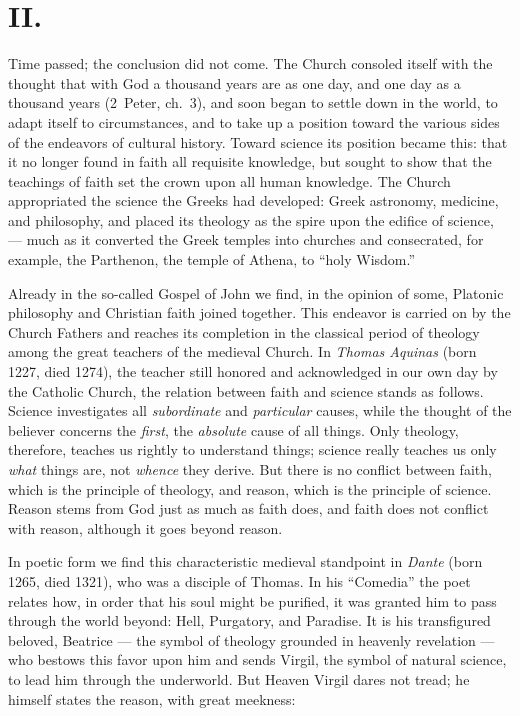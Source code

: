 \documentclass[12pt,a4paper,openany]{book}
\newcommand{\opage}[1]{\marginnote{\footnotesize\textit{[#1]}}}
\begin{document}
\section*{II.}

Time passed; the conclusion did not come. The Church consoled itself with
the thought that with God a thousand years are as one day, and one day as a
thousand years (2~Peter, ch.~3), and soon began to settle down in the world,
to adapt itself to circumstances, and to take up a position toward the
various sides of the endeavors of cultural history. Toward science its
position became this: that it no longer found in faith all requisite
knowledge, but sought to show that the teachings of faith set the crown upon
all human knowledge. The Church appropriated the
\opage{197}science the Greeks had developed: Greek astronomy, medicine, and philosophy, and placed its
theology as the spire upon the edifice of science, --- much as it converted the
Greek temples into churches and consecrated, for example, the Parthenon,
the temple of Athena, to ``holy Wisdom.''

Already in the so-called Gospel of John we find, in the opinion of some,
Platonic philosophy and Christian faith joined together. This endeavor is
carried on by the Church Fathers and reaches its completion in the classical
period of theology among the great teachers of the medieval Church. In
\emph{Thomas Aquinas} (born 1227, died 1274), the teacher still honored and
acknowledged in our own day by the Catholic Church, the relation between
faith and science stands as follows. Science investigates all \emph{subordinate} and
\emph{particular} causes, while the thought of the believer concerns the \emph{first}, the \emph{absolute}
cause of all things. Only theology, therefore, teaches us rightly to
understand things; science really teaches us only \emph{what}
things are, not \emph{whence}
they derive. But there is no conflict between faith, which is the principle of
theology, and reason, which is the principle of science. Reason stems from God
just as much as faith does, and faith does not conflict with reason, although
it goes beyond reason.

In poetic form we find this characteristic medieval standpoint in \emph{Dante} (born
1265, died 1321), who was a disciple of Thomas. In his ``Comedia'' the
poet relates how, in order that his soul might be purified, it was granted him
to pass through the world beyond: Hell, Purgatory, and Paradise. It is his
transfigured beloved, Beatrice --- the symbol of theology grounded in heavenly
revelation --- who bestows this favor upon him and sends Virgil, the symbol of
natural science, to lead him through the underworld. But Heaven Virgil dares
not tread; he himself states the reason, with great meekness:
\end{document}
